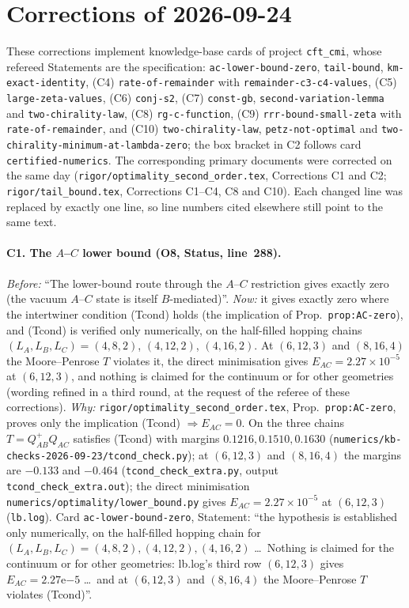 \documentclass[11pt]{article}
\theoremstyle{accent}
\theoremstyle{definition}
\begin{document}
\section*{Corrections of 2026-09-24}
{\sloppy
These corrections implement knowledge-base cards of project \texttt{cft\_cmi}, whose refereed
Statements are the specification: \texttt{ac-lower-bound-zero}, \texttt{tail-bound},
\texttt{km-exact-identity}, (C4) \texttt{rate-of-remainder} with \texttt{remainder-c3-c4-values}, (C5) \texttt{large-zeta-values}, (C6) \texttt{conj-s2}, (C7) \texttt{const-gb}, \texttt{second-variation-lemma} and \texttt{two-chirality-law}, (C8) \texttt{rg-c-function}, (C9) \texttt{rrr-bound-small-zeta} with \texttt{rate-of-remainder}, and (C10) \texttt{two-chirality-law}, \texttt{petz-not-optimal} and \texttt{two-chirality-minimum-at-lambda-zero};
the box bracket in C2 follows card \texttt{certified-numerics}.  The corresponding primary documents were corrected on the same day
(\texttt{rigor/optimality\_second\_order.tex}, Corrections C1 and C2; \texttt{rigor/tail\_bound.tex},
Corrections C1--C4, C8 and C10).  Each changed line was replaced by exactly one line, so line numbers
cited elsewhere still point to the same text.
\paragraph{C1. The \(A\)--\(C\) lower bound (O8, Status, line~288).}
\emph{Before:} ``The lower-bound route through the \(A\)--\(C\) restriction gives exactly zero (the
vacuum \(A\)--\(C\) state is itself \(B\)-mediated)''.
\emph{Now:} it gives exactly zero where the intertwiner condition (Tcond) holds (the implication of
Prop.~\texttt{prop:AC-zero}), and (Tcond) is verified only numerically, on the half-filled hopping
chains \((L_A,L_B,L_C)=(4,8,2)\), \((4,12,2)\), \((4,16,2)\).  At \((6,12,3)\) and \((8,16,4)\) the
Moore--Penrose \(T\) violates it, the direct minimisation gives \(E_{AC}=2.27\times10^{-5}\) at
\((6,12,3)\), and nothing is claimed for the continuum or for other geometries (wording refined in a
third round, at the request of the referee of these corrections).
\emph{Why:} \texttt{rigor/optimality\_second\_order.tex}, Prop.~\texttt{prop:AC-zero}, proves only the
implication (Tcond) \(\Rightarrow E_{AC}=0\).  On the three chains \(T=Q_{AB}^+Q_{AC}\) satisfies
(Tcond) with margins \(0.1216,0.1510,0.1630\) (\texttt{numerics/kb-checks-2026-09-23/tcond\_check.py});
at \((6,12,3)\) and \((8,16,4)\) the margins are \(-0.133\) and \(-0.464\)
(\texttt{tcond\_check\_extra.py}, output \texttt{tcond\_check\_extra.out}); the direct minimisation
\texttt{numerics/optimality/lower\_bound.py} gives \(E_{AC}=2.27\times10^{-5}\) at \((6,12,3)\)
(\texttt{lb.log}).  Card \texttt{ac-lower-bound-zero}, Statement: ``the hypothesis is established
only numerically, on the half-filled hopping chain for \((L_A,L_B,L_C)=(4,8,2),(4,12,2),(4,16,2)\)
\dots\ Nothing is claimed for the continuum or for other geometries: lb.log's third row \((6,12,3)\)
gives \(E_{AC}=2.27\mathrm{e}{-5}\) \dots\ and at \((6,12,3)\) and \((8,16,4)\) the Moore--Penrose \(T\)
violates (Tcond)''.
}
\end{document}
